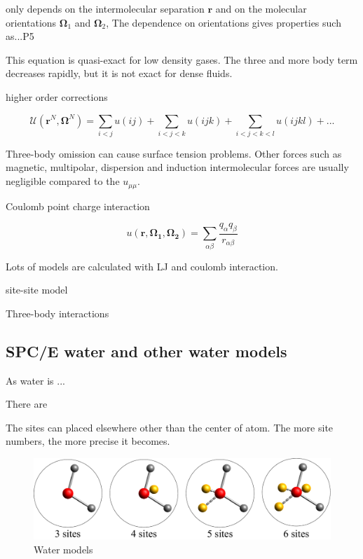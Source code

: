 only depends on the intermolecular separation $\mathbf{r}$ and on
the molecular orientations $\mathbf{\Omega}_{1}$ and $\mathbf{\Omega}_{2}$,
 The dependence on orientations gives properties such as...P5

This equation is quasi-exact for low density gases. The three and more
body term decreases rapidly, but it is not exact for dense fluids.

higher order corrections

\[
\mathcal{U}(\mathbf{r}^{N},\mathbf{\Omega}^{N})=\sum_{i<j}u(ij)+\sum_{i<j<k}u(ijk)+\sum_{i<j<k<l}u(ijkl)+...
\]


Three-body omission can cause surface tension problems. 
Other forces such as magnetic, multipolar, dispersion and induction
intermolecular forces are usually negligible compared to the $u_{\mu\mu}$. 

Coulomb point charge interaction

\begin{equation}
u(\mathbf{r},\mathbf{\Omega_{1}},\mathbf{\Omega_{2}})=\sum_{\alpha\beta}\frac{q_{\alpha}q_{\beta}}{r_{\alpha\beta}}
\end{equation}


Lots of models are calculated with LJ and coulomb interaction. 

site-site model

Three-body interactions


\subsection{SPC/E water and other water models}

As water is ...

There are 

The sites can placed elsewhere other than the center of atom. The more site numbers,
the more precise it becomes.

\begin{figure}[h]
\begin{centering}
\includegraphics[width=0.75\columnwidth]{_figure/water}
\par\end{centering}

\caption{Water models\label{fig:Water-models}}
\end{figure}


